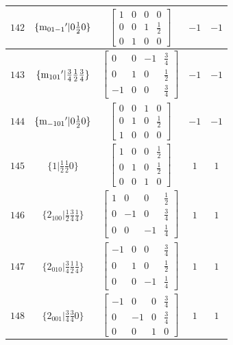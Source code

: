 \documentclass[fleqn,8pt]{jsarticle}
\begin{document}
\begin{longtable}{ccccc}
$ 142 $ & $ \{{\rm m}_{01-1}{}'|0 \frac{1}{2} 0\} $ & $ \begin{bmatrix} 1 & 0 & 0 & 0 \\ 0 & 0 & 1 & \frac{1}{2} \\ 0 & 1 & 0 & 0 \end{bmatrix} $ & $ -1 $ & $ -1 $ \\ \hline
$ 143 $ & $ \{{\rm m}_{101}{}'|\frac{3}{4} \frac{1}{2} \frac{3}{4}\} $ & $ \begin{bmatrix} 0 & 0 & -1 & \frac{3}{4} \\ 0 & 1 & 0 & \frac{1}{2} \\ -1 & 0 & 0 & \frac{3}{4} \end{bmatrix} $ & $ -1 $ & $ -1 $ \\ \hline
$ 144 $ & $ \{{\rm m}_{-101}{}'|0 \frac{1}{2} 0\} $ & $ \begin{bmatrix} 0 & 0 & 1 & 0 \\ 0 & 1 & 0 & \frac{1}{2} \\ 1 & 0 & 0 & 0 \end{bmatrix} $ & $ -1 $ & $ -1 $ \\ \hline
$ 145 $ & $ \{1|\frac{1}{2} \frac{1}{2} 0\} $ & $ \begin{bmatrix} 1 & 0 & 0 & \frac{1}{2} \\ 0 & 1 & 0 & \frac{1}{2} \\ 0 & 0 & 1 & 0 \end{bmatrix} $ & $ 1 $ & $ 1 $ \\ \hline
$ 146 $ & $ \{2{}_{100}|\frac{1}{2} \frac{3}{4} \frac{1}{4}\} $ & $ \begin{bmatrix} 1 & 0 & 0 & \frac{1}{2} \\ 0 & -1 & 0 & \frac{3}{4} \\ 0 & 0 & -1 & \frac{1}{4} \end{bmatrix} $ & $ 1 $ & $ 1 $ \\ \hline
$ 147 $ & $ \{2{}_{010}|\frac{3}{4} \frac{1}{2} \frac{1}{4}\} $ & $ \begin{bmatrix} -1 & 0 & 0 & \frac{3}{4} \\ 0 & 1 & 0 & \frac{1}{2} \\ 0 & 0 & -1 & \frac{1}{4} \end{bmatrix} $ & $ 1 $ & $ 1 $ \\ \hline
$ 148 $ & $ \{2{}_{001}|\frac{3}{4} \frac{3}{4} 0\} $ & $ \begin{bmatrix} -1 & 0 & 0 & \frac{3}{4} \\ 0 & -1 & 0 & \frac{3}{4} \\ 0 & 0 & 1 & 0 \end{bmatrix} $ & $ 1 $ & $ 1 $ \\ \hline

\end{longtable}
\end{document}
